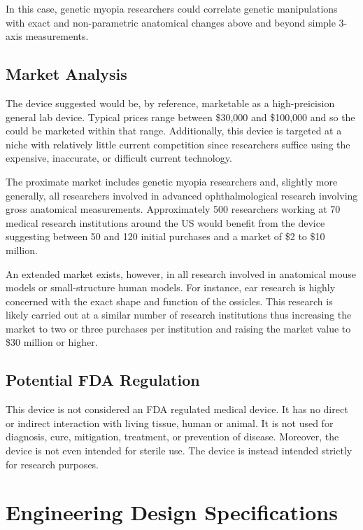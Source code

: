 \documentclass{article}
\begin{document}
In this case, genetic myopia researchers could correlate genetic
manipulations with exact and non-parametric anatomical changes above
and beyond simple 3-axis measurements.

\subsection{Market Analysis}
\label{sec:market-analysis}

The device suggested would be, by reference, marketable as a
high-preicision general lab device. Typical prices range between
\$30,000 and \$100,000 and so the could be marketed within that
range. Additionally, this device is targeted at a niche with
relatively little current competition since researchers suffice using
the expensive, inaccurate, or difficult current technology.

The proximate market includes genetic myopia researchers and, slightly
more generally, all researchers involved in advanced ophthalmological
research involving gross anatomical measurements. Approximately 500
researchers working at 70 medical research institutions around the US
would benefit from the device suggesting between 50 and 120 initial
purchases and a market of \$2 to \$10 million.

An extended market exists, however, in all research involved in
anatomical mouse models or small-structure human models. For instance,
ear research is highly concerned with the exact shape and function of
the ossicles. This research is likely carried out at a similar number
of research institutions thus increasing the market to two or three
purchases per institution and raising the market value to \$30 million
or higher.

\subsection{Potential FDA Regulation}
\label{sec:potent-fda}

This device is not considered an FDA regulated medical device. It has
no direct or indirect interaction with living tissue, human or
animal. It is not used for diagnosis, cure, mitigation, treatment, or
prevention of disease. Moreover, the device is not even intended for
sterile use. The device is instead intended strictly for research
purposes.

\section{Engineering Design Specifications}
\end{document}
